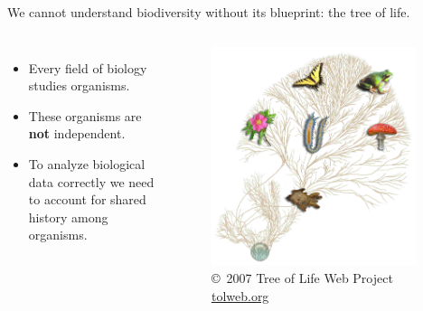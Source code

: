 \begin{frame}[t]
    \begin{adjustwidth}{-1.5em}{-1.5em}
    We cannot understand biodiversity without its blueprint: the tree of life.
    \begin{columns}


        \begin{itemize}[<+->]
            \item Every field of biology studies organisms.
            \item These organisms are \textbf{not} independent.
            \item To analyze biological data correctly we need to account for
                shared history among organisms.
        \end{itemize}

        \begin{figure}
            \begin{center}
            \includegraphics[width=0.95\textwidth]{../images/treeoflife.jpg}
            \caption{\tiny \copyright~2007 Tree of Life Web Project \href{http://tolweb.org/tree/}{tolweb.org}}
            \end{center}
        \end{figure}
    
    \end{columns}
    \end{adjustwidth}
\end{frame}


